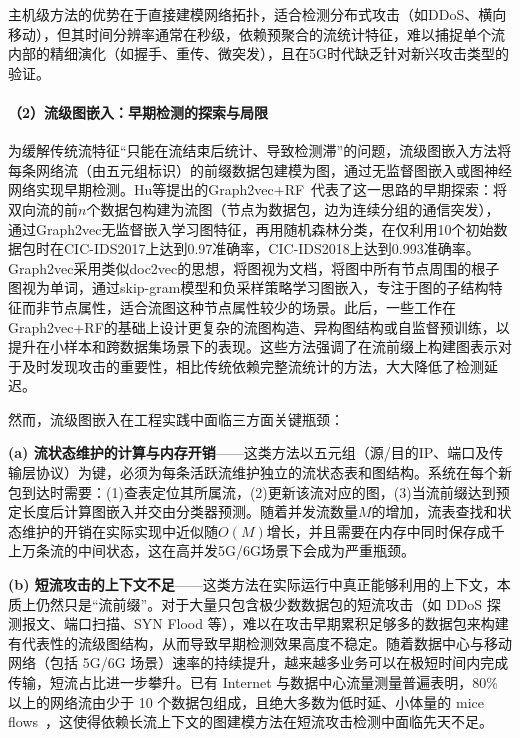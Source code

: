 主机级方法的优势在于直接建模网络拓扑，适合检测分布式攻击（如DDoS、横向移动），但其时间分辨率通常在秒级，依赖预聚合的流统计特征，难以捕捉单个流内部的精细演化（如握手、重传、微突发），且在5G时代缺乏针对新兴攻击类型的验证。

\paragraph{（2）流级图嵌入：早期检测的探索与局限}


为缓解传统流特征``只能在流结束后统计、导致检测滞''的问题，流级图嵌入方法将每条网络流（由五元组标识）的前缀数据包建模为图，通过无监督图嵌入或图神经网络实现早期检测。Hu等提出的Graph2vec+RF~\cite{Graph2vec+RF}代表了这一思路的早期探索：将双向流的前$n$个数据包构建为流图（节点为数据包，边为连续分组的通信突发），通过Graph2vec无监督嵌入学习图特征，再用随机森林分类，在仅利用10个初始数据包时在CIC-IDS2017上达到0.97准确率，CIC-IDS2018上达到0.993准确率。Graph2vec采用类似doc2vec的思想，将图视为文档，将图中所有节点周围的根子图视为单词，通过skip-gram模型和负采样策略学习图嵌入，专注于图的子结构特征而非节点属性，适合流图这种节点属性较少的场景。此后，一些工作在Graph2vec+RF的基础上设计更复杂的流图构造、异构图结构或自监督预训练，以提升在小样本和跨数据集场景下的表现。这些方法强调了在流前缀上构建图表示对于及时发现攻击的重要性，相比传统依赖完整流统计的方法，大大降低了检测延迟。

然而，流级图嵌入在工程实践中面临三方面关键瓶颈：

\textbf{(a) 流状态维护的计算与内存开销}——这类方法以五元组（源/目的IP、端口及传输层协议）为键，必须为每条活跃流维护独立的流状态表和图结构。系统在每个新包到达时需要：(1)查表定位其所属流，(2)更新该流对应的图，(3)当流前缀达到预定长度后计算图嵌入并交由分类器预测。随着并发流数量$M$的增加，流表查找和状态维护的开销在实际实现中近似随$O(M)$增长，并且需要在内存中同时保存成千上万条流的中间状态，这在高并发5G/6G场景下会成为严重瓶颈。

\textbf{(b) 短流攻击的上下文不足}——这类方法在实际运行中真正能够利用的上下文，本质上仍然只是``流前缀''。对于大量只包含极少数数据包的短流攻击（如 DDoS 探测报文、端口扫描、SYN Flood 等），难以在攻击早期累积足够多的数据包来构建有代表性的流级图结构，从而导致早期检测效果高度不稳定。随着数据中心与移动网络（包括 5G/6G 场景）速率的持续提升，越来越多业务可以在极短时间内完成传输，短流占比进一步攀升。已有 Internet 与数据中心流量测量普遍表明，80\% 以上的网络流由少于 10 个数据包组成，且绝大多数为低时延、小体量的 mice flows~\cite{Pekar2021}，这使得依赖长流上下文的图建模方法在短流攻击检测中面临先天不足。


